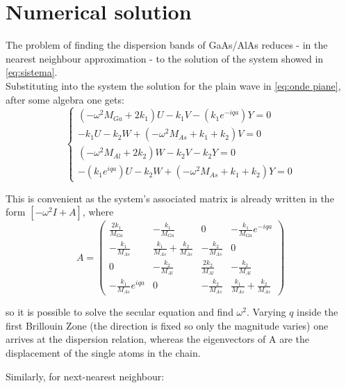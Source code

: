 \documentclass{article}
\begin{document}
\newpage
\section*{Numerical solution}
The problem of finding the dispersion bands of GaAs/AlAs reduces - in the nearest neighbour approximation - to the solution of the system showed in \autoref{eq:sistema}. \\
Substituting into the system the solution for the plain wave in \autoref{eq:onde piane}, after some algebra one gets:
\begin{equation}
	\begin{cases}
		(-\omega^2M_{Ga} + 2k_1)U - k_1V - (k_1e^{-iqa})Y = 0 \\
		-k_1U -k_2W + (-\omega^2M_{As} + k_1 + k_2)V = 0 \\
		(-\omega^2M_{Al} + 2k_2)W -k_2V - k_2Y = 0 \\
		-(k_1e^{iqa})U - k_2W + (-\omega^2M_{As} + k_1 + k_2)Y = 0	
	\end{cases}
	\label{sist.final}
\end {equation}

This is convenient as the system's associated matrix is already written in the form $[-\omega^2I + A]$, where
\begin{equation} 
A = \begin{pmatrix}
   \frac{2k_1}{M_{Ga}}				& -\frac{k_1}{M_{Ga}}  			 & 0  			 & -\frac{k_1}{M_{Ga}}e^{-iqa}  \\ 
   -\frac{k_1}{M_{As}} 				& \frac{k_1}{M_{As}}+\frac{k_2}{M_{As}}  & -\frac{k_2}{M_{As}}    & 0  \\ 
   0						& -\frac{k_2}{M_{Al}}  			 & \frac{2k_2}{M_{Al}} 	 & -\frac{k_2}{M_{Al}}  \\ 
   -\frac{k_1}{M_{As}}e^{iqa} 			& 0 					 & -\frac{k_2}{M_{As}}    & \frac{k_1}{M_{As}}+\frac{k_2}{M_{As}}   
\end{pmatrix} 
\label{eq:matrice}
\end{equation}


so it is possible to solve the secular equation and find $\omega^2$. Varying $q$ inside the first Brillouin Zone (the direction is fixed so only the magnitude varies) one arrives at the dispersion relation, whereas the eigenvectors of A are the displacement of the single atoms in the chain.\par
Similarly, for next-nearest neighbour:
\end{document}
